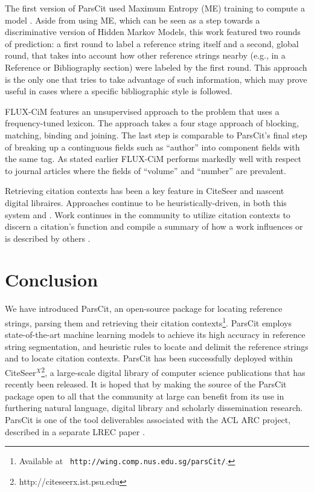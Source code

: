 \documentclass[10pt, a4paper]{article}
\begin{document}
The first version of ParsCit used Maximum Entropy (ME) training to
compute a model \cite{ng04:_citat_parsin_using_maxim_entrop_repair}.
Aside from using ME, which can be seen as a step towards a
discriminative version of Hidden Markov Models, this work featured two
rounds of prediction: a first round to label a reference string itself
and a second, global round, that takes into account how other
reference strings nearby (e.g., in a Reference or Bibliography
section) were labeled by the first round.  This approach is the only
one that tries to take advantage of such information, which may prove
useful in cases where a specific bibliographic style is followed.

FLUX-CiM \cite{1255219} features an unsupervised approach to the
problem that uses a frequency-tuned lexicon.  The approach takes a
four stage approach of blocking, matching, binding and joining.  The
last step is comparable to ParsCit's final step of breaking up a
continguous fields such as ``author'' into component fields with the
same tag.  As stated earlier FLUX-CiM performs markedly well with
respect to journal articles where the fields of ``volume'' and
``number'' are prevalent.

Retrieving citation contexts has been a key feature in CiteSeer and
nascent digital libraires.  Approaches continue to be
heuristically-driven, in both this system and
\cite{powley07:_eviden_based_infor_extrac_high}.  Work continues in
the community to utilize citation contexts to discern a citation's
function and compile a summary of how a work influences or is
described by others
\cite{teufel-siddharthan-tidhar:2006:EMNLP,wu06:_comut_analy_move_struc_acdem_abstr,schwartz-divoli-hearst:2007:EMNLP-CoNLL2007}.

\section{Conclusion}


We have introduced ParsCit, an open-source package for locating
reference strings, parsing them and retrieving their citation
contexts\footnote{Available at {\tt
http://wing.comp.nus.edu.sg/parsCit/}.}.  ParsCit employs
state-of-the-art machine learning models to achieve its high accuracy
in reference string segmentation, and heuristic rules to locate and
delimit the reference strings and to locate citation contexts.
ParsCit has been successfully deployed within
CiteSeer$^X$\footnote{http://citeseerx.ist.psu.edu}, a large-scale
digital library of computer science publications that has recently been released.
It is hoped that by making the source of the ParsCit
package open to all that the community at large can benefit from its
use in furthering natural language, digital library and scholarly
dissemination research.  ParsCit is one of the tool deliverables
associated with the ACL ARC project, described in a separate LREC
paper \cite{bird08:_acl_anthol_refer_corpus}.
\end{document}
